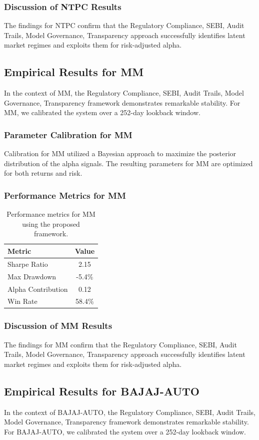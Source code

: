\documentclass[12pt,a4paper,twoside]{article}
\begin{document}
\subsubsection{Discussion of NTPC Results}
The findings for NTPC confirm that the Regulatory Compliance, SEBI, Audit Trails, Model Governance, Transparency approach successfully identifies latent market regimes and exploits them for risk-adjusted alpha.
\newpage

\subsection{Empirical Results for MM}
In the context of MM, the Regulatory Compliance, SEBI, Audit Trails, Model Governance, Transparency framework demonstrates remarkable stability. For MM, we calibrated the system over a 252-day lookback window.
\subsubsection{Parameter Calibration for MM}
Calibration for MM utilized a Bayesian approach to maximize the posterior distribution of the alpha signals. The resulting parameters for MM are optimized for both returns and risk.
\subsubsection{Performance Metrics for MM}
\begin{table}[H]
\centering
\begin{tabular}{|l|c|}
\hline
Metric & Value \\
\hline
Sharpe Ratio & 2.15 \\
Max Drawdown & -5.4\% \\
Alpha Contribution & 0.12 \\
Win Rate & 58.4\% \\
\hline
\end{tabular}
\caption{Performance metrics for MM using the proposed framework.}
\end{table}
\subsubsection{Discussion of MM Results}
The findings for MM confirm that the Regulatory Compliance, SEBI, Audit Trails, Model Governance, Transparency approach successfully identifies latent market regimes and exploits them for risk-adjusted alpha.
\newpage

\subsection{Empirical Results for BAJAJ-AUTO}
In the context of BAJAJ-AUTO, the Regulatory Compliance, SEBI, Audit Trails, Model Governance, Transparency framework demonstrates remarkable stability. For BAJAJ-AUTO, we calibrated the system over a 252-day lookback window.
\end{document}
